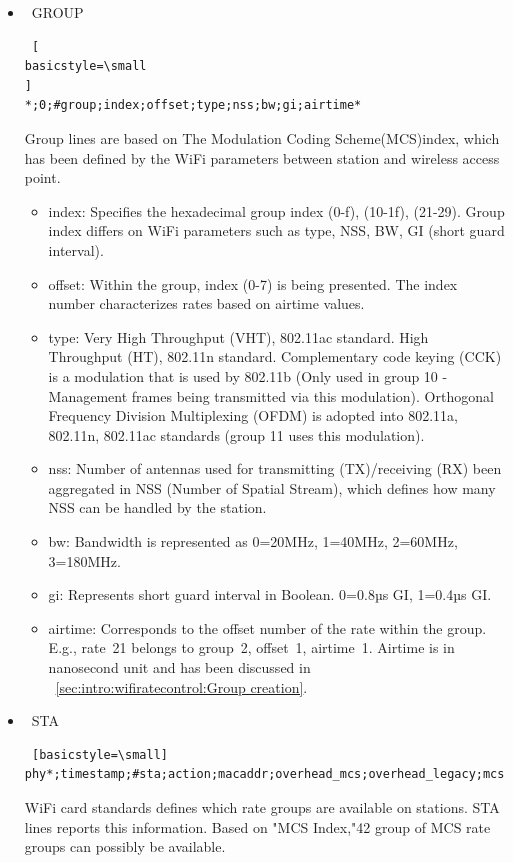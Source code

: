 \begin{sloppypar}
\begin{itemize}
\item \ GROUP
\begin{lstlisting} [
basicstyle=\small
]
*;0;#group;index;offset;type;nss;bw;gi;airtime*
\end{lstlisting}
Group lines are based on The Modulation Coding Scheme(MCS)index, which has been defined by the WiFi parameters between station and wireless access point.   
    \begin{itemize}
        \item index: Specifies the hexadecimal group index (0-f), (10-1f), (21-29). Group index differs on WiFi parameters such as type, NSS, BW, GI (short guard interval).
        \item offset: Within the group, index (0-7) is being presented. The index number characterizes rates based on airtime values.
        \item type: Very High Throughput (VHT), 802.11ac standard. High Throughput (HT), 802.11n standard. Complementary code keying (CCK) is a modulation that is used by 802.11b (Only used in group 10 - Management frames being transmitted via this modulation). Orthogonal Frequency Division Multiplexing (OFDM) is adopted into 802.11a, 802.11n, 802.11ac standards (group 11 uses this modulation).
        \item nss: Number of antennas used for transmitting (TX)/receiving (RX) been aggregated in NSS (Number of Spatial Stream), which defines how many NSS can be handled by the station.
        \item bw: Bandwidth is represented as 0=20MHz, 1=40MHz, 2=60MHz, 3=180MHz.
        \item gi: Represents short guard interval in Boolean. 0=0.8µs GI, 1=0.4µs GI.
        \item airtime: Corresponds to the offset number of the rate within the group. E.g., rate~21 belongs to group~2, offset~1, airtime~1. Airtime is in nanosecond unit and has been discussed in ~\ref{sec:intro:wifiratecontrol:Group creation}.
    \end{itemize}

\item \ STA
\begin{lstlisting} [basicstyle=\small]
phy*;timestamp;#sta;action;macaddr;overhead_mcs;overhead_legacy;mcs*
\end{lstlisting}
WiFi card standards defines which rate groups are available on stations. STA lines reports this information. Based on "MCS Index,"42 group of MCS rate groups can possibly be available.


\end{itemize}
\end{sloppypar}
